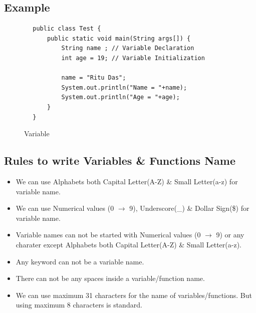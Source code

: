 \documentclass[openany]{book}  %
\begin{document}
\subsection{Example}
\begin{center}
    \begin{verbatim}
        public class Test {
            public static void main(String args[]) {
                String name ; // Variable Declaration
                int age = 19; // Variable Initialization

                name = "Ritu Das";
                System.out.println("Name = "+name);
                System.out.println("Age = "+age);
            }
        }
    \end{verbatim}
\end{center}
% 
% 
\begin{figure}[htbp]
    \begin{center}
        \quad\quad{}
        \caption{Variable\cite{Ref3}}
    \end{center}
\end{figure}
% 
%
\subsection{Rules to write Variables \& Functions Name}
\begin{itemize}
    \item We can use Alphabets both Capital Letter(A-Z) \& Small Letter(a-z) for \\ variable name.
    \item We can use Numerical values (0 $\to$ 9), Underscore(\_) \& Dollar Sign(\$) for \\ variable name.
    \item Variable names can not be started with Numerical values (0 $\to$ 9) or any \\ charater except Alphabets both Capital Letter(A-Z) \& Small Letter(a-z).
    \item Any keyword can not be a variable name.
    \item There can not be any spaces inside a variable/function name.
    \item We can use maximum 31 characters for the name of variables/functions. But \\ using maximum 8 characters is standard.
\end{itemize}
% 
% 
\end{document}
